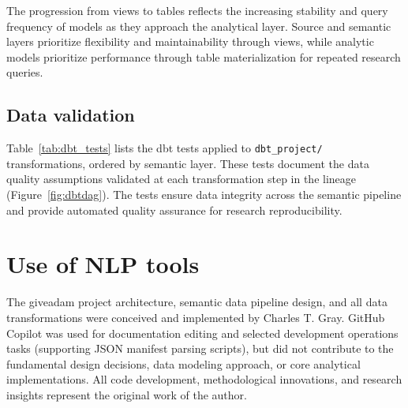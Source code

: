 \documentclass{article}
\begin{document}
The progression from views to tables reflects the increasing stability and query frequency of models as they approach the analytical layer. Source and semantic layers prioritize flexibility and maintainability through views, while analytic models prioritize performance through table materialization for repeated research queries.

\subsection{Data validation}

Table~\ref{tab:dbt_tests} lists the dbt tests applied to \texttt{dbt\_project/} transformations, ordered by semantic layer. These tests document the data quality assumptions validated at each transformation step in the lineage (Figure~\ref{fig:dbtdag}). The tests ensure data integrity across the semantic pipeline and provide automated quality assurance for research reproducibility.



\section{Use of NLP tools}

The giveadam project architecture, semantic data pipeline design, and all data transformations were conceived and implemented by Charles T. Gray. GitHub Copilot \cite{copilot} was used for documentation editing and selected development operations tasks (supporting JSON manifest parsing scripts), but did not contribute to the fundamental design decisions, data modeling approach, or core analytical implementations. All code development, methodological innovations, and research insights represent the original work of the author.
\end{document}
